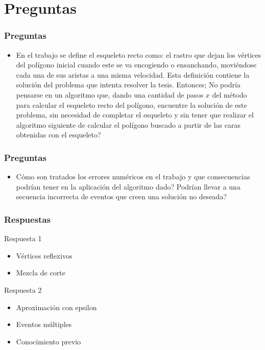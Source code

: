 \documentclass[notes=show]{beamer}
\begin{document}
\section{Preguntas}
\begin{frame}
\frametitle{Preguntas}
\begin{itemize}

\item<1-> En el trabajo se define el esqueleto recto como: el rastro que dejan los v\'ertices del pol\'igono inicial cuando este se va encogiendo o ensanchando, movi\'endose cada una de sus aristas a una misma velocidad. Esta definici\'on contiene la soluci\'on del problema que intenta resolver la tesis. Entonces; \textquestiondown No podr\'ia pensarse en un algoritmo que, dando una cantidad de pasos $x$ del m\'etodo para calcular el esqueleto recto del pol\'igono, encuentre la soluci\'on de este problema, sin necesidad de completar el esqueleto y sin tener que realizar el algoritmo siguiente de calcular el pol\'igono buscado a partir de las caras obtenidas con el esqueleto? 

\end{itemize}
\transdissolve[duration=0.4]
\end{frame}

\begin{frame}
\frametitle{Preguntas}
\begin{itemize}

\item<1-> \textquestiondown C\'omo son tratados los errores num\'ericos en el trabajo y que consecuencias podr\'ian tener en la aplicaci\'on del algoritmo dado? \textquestiondown Podr\'ian llevar a una secuencia incorrecta de eventos que creen una soluci\'on no deseada? 

\end{itemize}
\transdissolve[duration=0.4]
\end{frame}

\begin{frame}
\frametitle{Respuestas}
\begin{block}{Respuesta 1}
\begin{itemize}
\item<1-| alert@+> V\'ertices reflexivos
\item<2-| alert@+> Mezcla de corte

\end{itemize}
\end{block}

\begin{block}{Respuesta 2}
\begin{itemize}
\item<3-| alert@+> Aproximaci\'on con epsilon 
\item<4-| alert@+> Eventos m\'ultiples
\item<5-| alert@+> Conocimiento previo

\end{itemize}
\end{block}
\transboxin[duration=0.2]
\end{frame}
\end{document}
